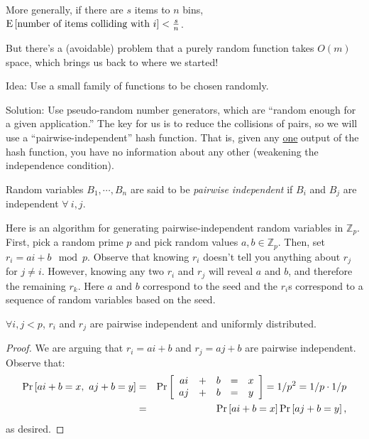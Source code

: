 \documentclass{article}
\renewcommand{\Pr}[1]{\textnormal{Pr}\left[ #1 \right]}
\newcommand{\E}[1]{\textnormal{E}\left[ #1 \right]}
\begin{document}
More generally, if there are $s$ items to $n$ bins, $\E{\hbox{number of items colliding with }i} < \frac{s}{n}$.

But there's a (avoidable) problem that a purely random function takes $O(m)$ space, which brings us back to where we started!

Idea: Use a small family of functions to be chosen randomly.

Solution: Use pseudo-random number generators, which are ``random enough for a given application.''  The key for us is to reduce the collisions of pairs, so we will use a ``pairwise-independent'' hash function.  That is, given any \underline{one} output of the hash function, you have no information about any other (weakening the independence condition).

\begin{definition}

Random variables $B_1, \cdots, B_n$ are said to be \emph{pairwise independent} if $B_i$ and $B_j$ are independent $\forall\ i, j$.
\end{definition}

Here is an algorithm for generating pairwise-independent random variables in
${\mathbb Z}_p$.  First, pick a random prime $p$ and pick random values $a, b
\in {\mathbb Z}_p$.  Then, set $r_i = ai + b \mod p$.  Observe that
knowing $r_i$ doesn't tell you anything about $r_j$ for $j \not= i$.  However,
knowing any two $r_i$ and $r_j$ will reveal $a$ and $b$, and therefore the
remaining $r_k$.  Here $a$ and $b$ correspond to the seed and the $r_i$s
correspond to a sequence of random variables based on the seed.

\begin{claim}
$\forall i,j < p$, $r_i$ and $r_j$ are pairwise independent and uniformly distributed.
\end{claim}

\begin{proof}
We are arguing that $r_i = ai + b$ and $r_j = aj + b$ are pairwise independent.  Observe that:
\begin{eqnarray*}
  \Pr{ai+b = x,\ aj+b = y} & = &
  \Pr{
  \begin{array}{ccccc}
    a i & + & b & = & x \\
    a j & + & b & = & y 
  \end{array}
  }
  = 1/p^2 = 1/p \cdot 1/p \\
  & = & \Pr{ai+b = x}\Pr{aj+b = y},
\end{eqnarray*}
as desired. \hfill
\end{proof}
\end{document}
